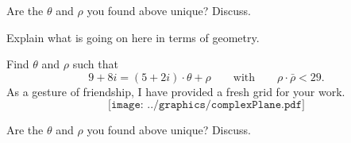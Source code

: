 \begin{prob}
Are the $\theta$ and $\rho$ you found above unique? Discuss.
\end{prob}

\begin{prob} 
Explain what is going on here in terms of geometry.
\end{prob}

\begin{prob}
Find $\theta$ and $\rho$ such that
\[
9 + 8i  = (5+2i)\cdot \theta + \rho \qquad \text{with}\qquad 
\rho\cdot\bar{\rho} <  29.
\]
As a gesture of friendship, I have provided a fresh grid for your
work.
\[
\texttt{[image: ../graphics/complexPlane.pdf]}
\]
\end{prob}



\begin{prob}
Are the $\theta$ and $\rho$ you found above unique? Discuss.
\end{prob}
